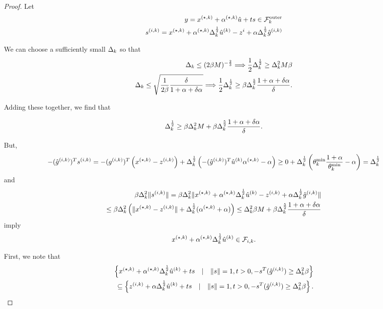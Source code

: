 \begin{proof}
Let
\begin{align*}
y = {x^{(\star, k)}} + {\alpha^{(\star, k)}} \hat u + ts \in {\mathcal {F}^{\text{outer}}_k} \\
s^{(i, k)} = {x^{(\star, k)}} + {\alpha^{(\star, k)}}\Delta_k^{\frac 1 2}{{\hat u}^{(k)}} - z^i + \alpha\Delta_k^{\frac 1 2}{{\hat g}^{(i, k)}}\\
\end{align*}

We can choose a sufficiently small $\Delta_k$ so that
\begin{align*}
\Delta_k \le (2\beta M)^{-\frac 2 3} \Longrightarrow \frac 1 2 \Delta_k^{\frac 1 2 } \ge \Delta_k^2 M\beta \\
\Delta_k \le \sqrt{\frac 1 {2\beta} \frac{\delta}{1 + \alpha + \delta\alpha}} \Longrightarrow \frac 1 2 \Delta_k^{\frac 1 2 } \ge \beta\Delta_k^{\frac 5 2}\frac{1 + \alpha + \delta\alpha}{\delta}.
\end{align*}

Adding these together, we find that

\begin{align*}
\Delta_k^{\frac 1 2 } \ge \beta \Delta_k^2 M + \beta \Delta_k^{\frac 5 2}\frac{1 + \alpha + \delta\alpha}{\delta}.
\end{align*}

But,
\begin{align*}
-({{\hat g}^{(i, k)}})^T s^{(i, k)} = -({g^{(i, k)}})^T \left({x^{(\star, k)}} - {z^{(i, k)}}\right) + \Delta_k^{\frac 1 2}\left(-({{\hat g}^{(i, k)}})^T{{\hat u}^{(k)}}{\alpha^{(\star, k)}} - \alpha\right)
\ge 0 + \Delta_k^{\frac 1 2}\left(\theta^{\text{min}}_k \frac{1 + \alpha}{\theta^{\text{min}}_k} - \alpha\right) = \Delta_k^{\frac 1 2 }\\
\end{align*}
and
\begin{align*}
\beta\Delta_k^2\|s^{(i, k)}\| = \beta\Delta_k^2\|{x^{(\star, k)}} + {\alpha^{(\star, k)}}\Delta_k^{\frac 1 2}{{\hat u}^{(k)}} - {z^{(i, k)}} + \alpha\Delta_k^{\frac 1 2}{{\hat g}^{(i, k)}} \| \\
\le \beta\Delta_k^2\left(\|{x^{(\star, k)}} - {z^{(i, k)}} \| + \Delta_k^{\frac 1 2} ({\alpha^{(\star, k)}} + \alpha)\right) 
\le \Delta_k^2\beta M + \beta \Delta_k^{\frac 5 2}\frac{1 + \alpha + \delta\alpha}{\delta}
\end{align*}
imply 
\begin{align*}
{x^{(\star, k)}} + {\alpha^{(\star, k)}}\Delta_k^{\frac 1 2}{{\hat u}^{(k)}} \in {\mathcal F_{i, k}}.
\end{align*}

First, we note that
\begin{align*}
\left \{{x^{(\star, k)}} + {\alpha^{(\star, k)}}\Delta_k^{\frac 1 2}{{\hat u}^{(k)}}  + t s\quad | \quad \|s\| = 1, t> 0, -s^T({{\hat g}^{(i, k)}})\ge\Delta_k^2\beta \right\} \\
\subseteq \left \{{z^{(i, k)}} + \alpha\Delta_k^{\frac 1 2}{{\hat u}^{(k)}} + t s\quad | \quad \|s\| = 1, t> 0, -s^T({{\hat g}^{(i, k)}})\ge\Delta_k^2\beta \right\}.  \\
\end{align*}


\end{proof}
